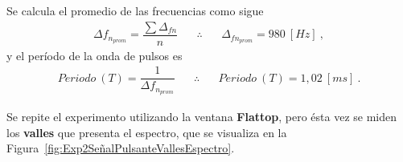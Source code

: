       Se calcula el promedio de las frecuencias como sigue
      \begin{align*}
        \Delta f_{n_{prom}}=\dfrac{\sum{\Delta_{fn}}}{n} \hspace{20pt} \therefore \hspace{20pt} \boxed{\Delta_{fn_{prom}}=980~[Hz]}~,
      \end{align*}
      y el período de la onda de pulsos es 
      \begin{align*}
        Periodo~\left( T \right)=\dfrac{1}{\Delta f_{n_{prom}}} \hspace{20pt} \therefore \hspace{20pt} \boxed{Periodo~\left( T \right)=1,02~[ms]}~.
      \end{align*}

        Se repite el experimento utilizando la ventana \textbf{Flattop}, pero ésta vez se miden los 
        \textbf{valles} que presenta el espectro, que se visualiza en la 
        Figura~\ref{fig:Exp2SeñalPulsanteVallesEspectro}.

